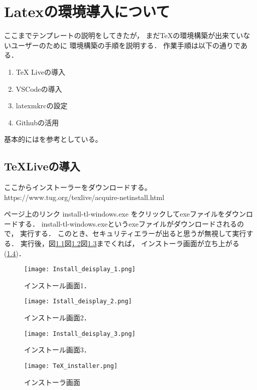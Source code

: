 \chapter{Latexの環境導入について}
ここまでテンプレートの説明をしてきたが，
まだTeXの環境構築が出来ていないユーザーのために
環境構築の手順を説明する．
作業手順は以下の通りである．
\begin{enumerate}
  \item TeX Liveの導入
  \item VSCodeの導入
  \item latexmkrcの設定
  \item Githubの活用
\end{enumerate}
基本的には\cite{Tex_bilud}を参考としている。

\section{TeXLiveの導入}
ここからインストーラーをダウンロードする。
https://www.tug.org/texlive/acquire-netinstall.html

ページ上のリンク install-tl-windows.exe 
をクリックしてexeファイルをダウンロードする．
install-tl-windows.exeというexeファイルがダウンロードされるので，
実行する．
このとき、セキュリティエラーが出ると思うが無視して実行する．
実行後，図\ref{fig:install_deisplay_1}図\ref{fig:install_deisplay_2}図\ref{fig:install_deisplay_3}までくれば，
インストーラ画面が立ち上がる(\ref{fig:tex_installer})．
\begin{figure}[H]
    \centering
    \texttt{[image: Install\_deisplay\_1.png]}
    \caption{インストール画面1．}
    \label{fig:install_deisplay_1}
\end{figure}

\begin{figure}[H]
  \centering
  \texttt{[image: Istall\_deisplay\_2.png]}
  \caption{インストール画面2．}
  \label{fig:install_deisplay_2}
\end{figure}

\begin{figure}[H]
  \centering
  \texttt{[image: Install\_deisplay\_3.png]}
  \caption{インストール画面3．}
  \label{fig:install_deisplay_3}
\end{figure}

\begin{figure}[H]
  \centering
  \texttt{[image: TeX\_installer.png]}
  \caption{インストーラ画面}
  \label{fig:tex_installer}
\end{figure}

